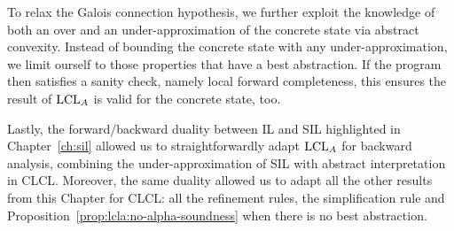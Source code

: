 To relax the Galois connection hypothesis, we further exploit the knowledge of both an over and an under-approximation of the concrete state via abstract convexity. Instead of bounding the concrete state with any under-approximation, we limit ourself to those properties that have a best abstraction. If the program then satisfies a sanity check, namely local forward completeness, this ensures the result of $\text{LCL}_A$ is valid for the concrete state, too.

Lastly, the forward/backward duality between IL and SIL highlighted in Chapter~\ref{ch:sil} allowed us to straightforwardly adapt $\text{LCL}_A$ for backward analysis, combining the under-approximation of SIL with abstract interpretation in CLCL. Moreover, the same duality allowed us to adapt all the other results from this Chapter for CLCL: all the refinement rules, the simplification rule and Proposition~\ref{prop:lcla:no-alpha-soundness} when there is no best abstraction.

%

